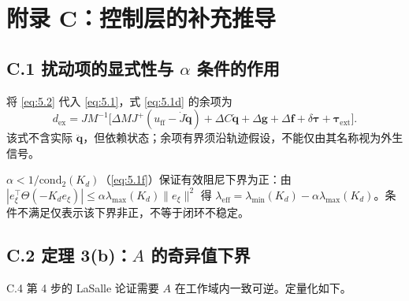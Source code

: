 
\section*{附录 C：控制层的补充推导}

\subsection*{C.1 扰动项的显式性与 $\alpha$ 条件的作用}

将 \eqref{eq:5.2} 代入 \eqref{eq:5.1}，式 \eqref{eq:5.1d} 的余项为
\begin{equation*}
d_{\mathrm{ex}}=JM^{-1}\bigl[\Delta M J^+(u_{\mathrm{ff}}-\dot J\dot{\boldsymbol q})+\Delta C\dot{\boldsymbol q}+\Delta\boldsymbol g+\Delta\boldsymbol f+\delta\boldsymbol\tau+\boldsymbol\tau_{\mathrm{ext}}\bigr].
\end{equation*}
该式不含实际 $\ddot{\boldsymbol q}$，但依赖状态；余项有界须沿轨迹假设，不能仅由其名称视为外生信号。

$\alpha<1/\mathrm{cond}_2(K_d)$（\eqref{eq:5.1f}）保证有效阻尼下界为正：由 $|e_\xi^\top\Theta(-K_de_\xi)|\le\alpha\lambda_{\max}(K_d)\|e_\xi\|^2$ 得 $\lambda_{\mathrm{eff}}=\lambda_{\min}(K_d)-\alpha\lambda_{\max}(K_d)$。条件不满足仅表示该下界非正，不等于闭环不稳定。

\subsection*{C.2 定理 3(b)：$A$ 的奇异值下界}

C.4 第 4 步的 LaSalle 论证需要 $A$ 在工作域内一致可逆。定量化如下。

